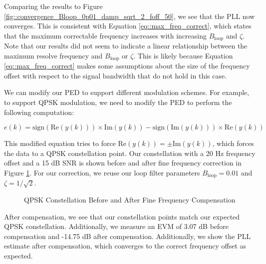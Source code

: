 \documentclass{article}
\begin{document}
\noindent Comparing the results to Figure \ref{fig::convergence_Bloop_0p01_damp_sqrt_2_foff_50}, we see that the PLL now converges. This is consistent with Equation \ref{eq::max_freq_correct}, which states that the maximum correctable frequency increases with increasing  $B_{\text{loop}}$ and $\zeta$. Note that our results did not seem to indicate a linear relationship between the maximum resolve frequency and $B_{\text{loop}}$ or $\zeta$. This is likely because Equation \ref{eq::max_freq_correct} makes some assumptions about the size of the frequency offset with respect to the signal bandwidth that do not hold in this case.

We can modify our PED to support different modulation schemes. For example, to support QPSK modulation, we need to modify the PED to perform the following computation:

\begin{equation}
	e(k) = \text{sign}(\text{Re}(y(k))) \times \text{Im}(y(k)) - \text{sign}(\text{Im}(y(k))) \times \text{Re}(y(k))
\end{equation}

\noindent This modified equation tries to force $\text{Re}(y(k)) = \pm \text{Im}(y(k))$, which forces the data to a QPSK constellation point. Our constellation with a 20 Hz frequency offset and a 15 dB SNR is shown before and after fine frequency correction in Figure \ref{fig::fine_freq_comp_qpsk_const}. For our correction, we reuse our loop filter parameters $B_{\text{loop}}=0.01$ and $\zeta=1/\sqrt{2}$.

\begin{figure}[H]
	\centerline{}
	\caption{QPSK Constellation Before and After Fine Frequency Compensation}
	\label{fig::fine_freq_comp_qpsk_const}
\end{figure}

\noindent After compensation, we see that our constellation points match our expected QPSK constellation. Additionally, we measure an EVM of 3.07 dB before compensation and -14.75 dB after compensation. Additionally, we show the PLL estimate after compensation, which converges to the correct frequency offset as expected.
\end{document}

